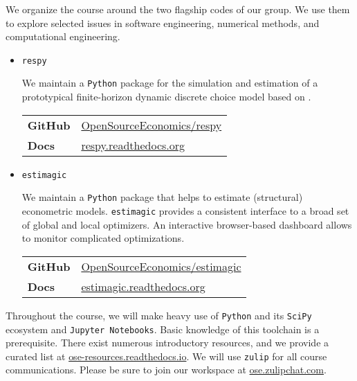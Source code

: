 





\nobibliography*



\noindent We organize the course around the two flagship codes of our group. We use them to explore selected issues in software engineering, numerical methods, and computational engineering.

\begin{itemize}

\item \verb+respy+

We maintain a \verb+Python+ package for the simulation and estimation of a prototypical finite-horizon dynamic discrete choice model based on \citet{Keane.1997}.\vspace{0.3cm}

\begin{tabular}{ll}
\textbf{GitHub}        & \url{OpenSourceEconomics/respy}\\
\textbf{Docs}     & \url{respy.readthedocs.org}
\end{tabular}\vspace{0.3cm}

\item \verb+estimagic+

We maintain a \verb+Python+ package that helps to estimate (structural) econometric models. \verb+estimagic+ provides a consistent interface to a broad set of global and local optimizers. An interactive browser-based dashboard  allows to monitor complicated optimizations.\vspace{0.3cm}

\begin{tabular}{ll}
\textbf{GitHub}        & \url{OpenSourceEconomics/estimagic}\\
\textbf{Docs}     & \url{estimagic.readthedocs.org}
\end{tabular}\vspace{0.3cm}
\end{itemize}

\noindent Throughout the course, we will make heavy use of \verb+Python+ and its \verb+SciPy+ ecosystem and \verb+Jupyter Notebooks+. Basic knowledge of this toolchain is a prerequisite. There exist numerous introductory resources, and we provide a curated list at \url{ose-resources.readthedocs.io}. We will use \verb+zulip+ for all course communications. Please be sure to join our workspace at \url{ose.zulipchat.com}.

